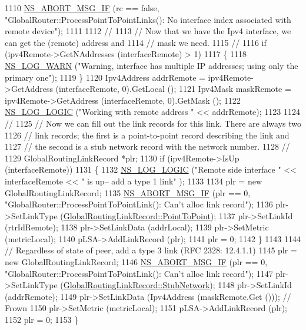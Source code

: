 \begin{DoxyCode}
1110   \hyperlink{group__fatal_ga6653324225bc139e46deea177614ceee}{NS\_ABORT\_MSG\_IF} (rc == \textcolor{keyword}{false}, \textcolor{stringliteral}{"GlobalRouter::ProcessPointToPointLinks(): No interface
       index associated with remote device"});
1111 
1112   \textcolor{comment}{//}
1113   \textcolor{comment}{// Now that we have the Ipv4 interface, we can get the (remote) address and}
1114   \textcolor{comment}{// mask we need.}
1115   \textcolor{comment}{//}
1116   \textcolor{keywordflow}{if} (ipv4Remote->GetNAddresses (interfaceRemote) > 1)
1117     \{
1118       \hyperlink{group__logging_gade7208b4009cdf0e25783cd26766f559}{NS\_LOG\_WARN} (\textcolor{stringliteral}{"Warning, interface has multiple IP addresses; using only the primary one"});
1119     \}
1120   Ipv4Address addrRemote = ipv4Remote->GetAddress (interfaceRemote, 0).GetLocal ();
1121   Ipv4Mask maskRemote = ipv4Remote->GetAddress (interfaceRemote, 0).GetMask ();
1122   \hyperlink{group__logging_ga88acd260151caf2db9c0fc84997f45ce}{NS\_LOG\_LOGIC} (\textcolor{stringliteral}{"Working with remote address "} << addrRemote);
1123 
1124   \textcolor{comment}{//}
1125   \textcolor{comment}{// Now we can fill out the link records for this link.  There are always two}
1126   \textcolor{comment}{// link records; the first is a point-to-point record describing the link and}
1127   \textcolor{comment}{// the second is a stub network record with the network number.}
1128   \textcolor{comment}{//}
1129   GlobalRoutingLinkRecord *plr;
1130   \textcolor{keywordflow}{if} (ipv4Remote->IsUp (interfaceRemote))
1131     \{
1132       \hyperlink{group__logging_ga88acd260151caf2db9c0fc84997f45ce}{NS\_LOG\_LOGIC} (\textcolor{stringliteral}{"Remote side interface "} << interfaceRemote << \textcolor{stringliteral}{" is up-- add a type 1 link"}
      );
1133  
1134       plr  = \textcolor{keyword}{new} GlobalRoutingLinkRecord;
1135       \hyperlink{group__fatal_ga6653324225bc139e46deea177614ceee}{NS\_ABORT\_MSG\_IF} (plr == 0, \textcolor{stringliteral}{"GlobalRouter::ProcessPointToPointLink(): Can't alloc link
       record"});
1136       plr->SetLinkType (\hyperlink{classns3_1_1GlobalRoutingLinkRecord_a9380bcce9bca03943c4761b166a694f4aa345c79cdcaba957f5e8296509183912}{GlobalRoutingLinkRecord::PointToPoint});
1137       plr->SetLinkId (rtrIdRemote);
1138       plr->SetLinkData (addrLocal);
1139       plr->SetMetric (metricLocal);
1140       pLSA->AddLinkRecord (plr);
1141       plr = 0;
1142     \}
1143 
1144   \textcolor{comment}{// Regardless of state of peer, add a type 3 link (RFC 2328: 12.4.1.1)}
1145   plr = \textcolor{keyword}{new} GlobalRoutingLinkRecord;
1146   \hyperlink{group__fatal_ga6653324225bc139e46deea177614ceee}{NS\_ABORT\_MSG\_IF} (plr == 0, \textcolor{stringliteral}{"GlobalRouter::ProcessPointToPointLink(): Can't alloc link
       record"});
1147   plr->SetLinkType (\hyperlink{classns3_1_1GlobalRoutingLinkRecord_a9380bcce9bca03943c4761b166a694f4a183ff8c880e05253fdca7bece2cad90b}{GlobalRoutingLinkRecord::StubNetwork});
1148   plr->SetLinkId (addrRemote);
1149   plr->SetLinkData (Ipv4Address (maskRemote.Get ()));  \textcolor{comment}{// Frown}
1150   plr->SetMetric (metricLocal);
1151   pLSA->AddLinkRecord (plr);
1152   plr = 0;
1153 \}
\end{DoxyCode}


